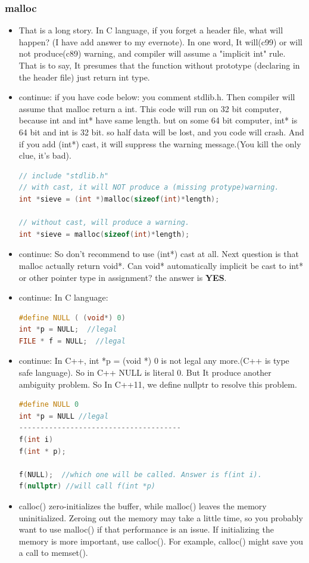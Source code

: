 \documentclass[a4paper,12pt,twoside]{book}
\begin{document}
\subsubsection{malloc}
\begin{itemize}
	\item That is a long story. In C language, if you forget a header file, what will happen? (I have add answer to my evernote). In one word, It will(c99) or will not produce(c89) warning, and compiler will assume a "implicit int" rule. That is to say, It presumes that the function without prototype (declaring in the header file) just return int type.
	
	\item continue: if you have code below: you comment stdlib.h. Then compiler will assume that malloc return a int.  This code will run on 32 bit computer, because int and int* have same length. but on some 64 bit computer, int* is 64 bit and int is 32 bit.  so half data will be lost, and you code will crash.
	And if you add (int*) cast, it will suppress the warning message.(You kill the only clue, it's bad).
\begin{lstlisting}[frame=single, language=c++]
// include "stdlib.h"
// with cast, it will NOT produce a (missing protype)warning.
int *sieve = (int *)malloc(sizeof(int)*length);

// without cast, will produce a warning.
int *sieve = malloc(sizeof(int)*length);
\end{lstlisting}
	
	\item continue: So don't recommend to use (int*) cast at all. Next question is that malloc actually return void*. Can void* automatically implicit be cast to int* or other pointer type in assignment? the answer is \textbf{YES}.
	
	\item  continue: In C language:
\begin{lstlisting}[frame=single, language=c++]
#define NULL ( (void*) 0)
int *p = NULL;  //legal
FILE * f = NULL;  //legal
\end{lstlisting}
	
	\item continue: In C++, int *p = (void *) 0 is not legal any more.(C++ is type safe language).  So in C++ NULL is literal 0. But It produce another ambiguity problem.  So In C++11, we define nullptr to resolve this problem.
\begin{lstlisting}[frame=single, language=c++]
#define NULL 0
int *p = NULL //legal
--------------------------------------
f(int i)
f(int * p);
	
f(NULL);  //which one will be called. Answer is f(int i).
f(nullptr) //will call f(int *p)
\end{lstlisting}
	
	\item calloc() zero-initializes the buffer, while malloc() leaves the memory uninitialized. Zeroing out the memory may take a little time, so you probably want to use malloc() if that performance is an issue. If initializing the memory is more important, use calloc(). For example, calloc() might save you a call to memset().
\end{itemize}
\end{document}
